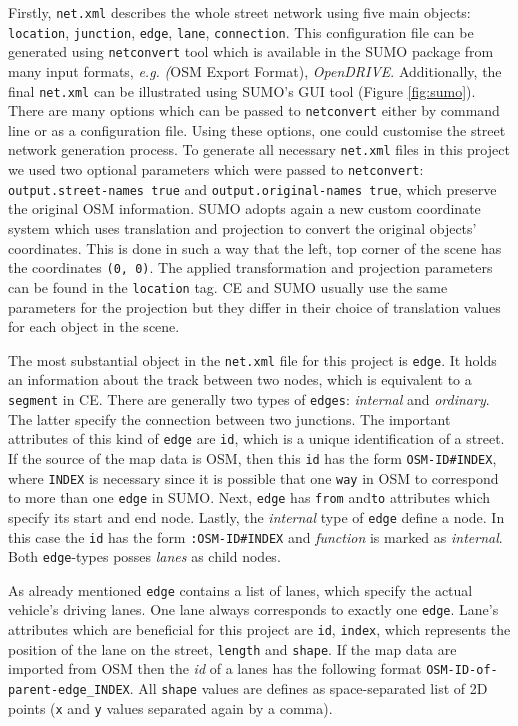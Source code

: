Firstly, \texttt{net.xml} describes the whole street network using five main objects: \texttt{location}, \texttt{junction}, \texttt{edge}, \texttt{lane}, \texttt{connection}. This configuration file can be generated using \texttt{netconvert} tool which is available in the SUMO package from many input formats, \emph{e.g.} \emph(OSM Export Format), \emph{OpenDRIVE}. Additionally, the final \texttt{net.xml} can be illustrated using SUMO's GUI tool (Figure \ref{fig:sumo}). There are many options which can be passed to \texttt{netconvert} either by command line or as a configuration file. Using these options, one could customise the street network generation process. To generate all necessary \texttt{net.xml} files in this project we used two optional parameters which were passed to \texttt{netconvert}: \texttt{output.street-names true} and \texttt{output.original-names true}, which preserve the original OSM information. SUMO adopts again a new custom coordinate system which uses translation and projection to convert the original objects' coordinates. This is done in such a way that the left, top corner of the scene has the coordinates \texttt{(0, 0)}. The applied transformation and projection parameters can be found in the \texttt{location} tag. CE and SUMO usually use the same parameters for the  projection but they differ in their choice of translation values for each object in the scene.

The most substantial object in the \texttt{net.xml} file for this project is \texttt{edge}. It holds an information about the track between two nodes, which is equivalent to a \texttt{segment} in CE. There are generally two types of \texttt{edges}: \emph{internal} and \emph{ordinary}. The latter specify the connection between two junctions. The important attributes of this kind of \texttt{edge} are \texttt{id}, which is a unique identification of a street. If the source of the map data is OSM, then this \texttt{id} has the form \texttt{OSM-ID\#INDEX}, where \texttt{INDEX} is necessary since it is possible that one \texttt{way} in OSM to correspond to more than one \texttt{edge} in SUMO. Next, \texttt{edge} has \texttt{from} and\texttt{to} attributes which specify its start and end node. Lastly, the \emph{internal} type of \texttt{edge} define a node. In this case the \texttt{id} has the form \texttt{:OSM-ID\#INDEX} and \emph{function} is marked as \emph{internal}. Both \texttt{edge}-types posses \emph{lanes} as child nodes.

As already mentioned \texttt{edge} contains a list of lanes, which specify the actual vehicle's driving lanes. One lane always corresponds to exactly one \texttt{edge}. Lane's attributes which are beneficial for this project are \texttt{id}, \texttt{index}, which represents the position of the lane on the street, \texttt{length} and \texttt{shape}. If the map data are imported from OSM then the \emph{id} of a lanes has the following format \texttt{OSM-ID-of-parent-edge\_INDEX}. All \texttt{shape} values are defines as space-separated list of 2D points (\texttt{x} and \texttt{y} values separated again by a comma).

